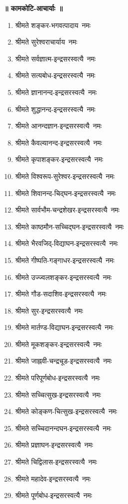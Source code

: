 \begin{center}
\begin{flushleft}
\medskip

\centerline{\bfseries ॥ कामकोटि-आचार्याः ॥}
\begin{enumerate}
\item श्रीमते शङ्कर-भगवत्पादाय~नमः
\item श्रीमते सुरेश्वराचार्याय~नमः
\item श्रीमते सर्वज्ञात्म-इन्द्रसरस्वत्यै~नमः
\item श्रीमते सत्यबोध-इन्द्रसरस्वत्यै~नमः
\item श्रीमते ज्ञानानन्द-इन्द्रसरस्वत्यै~नमः
\item श्रीमते शुद्धानन्द-इन्द्रसरस्वत्यै~नमः
\item श्रीमते आनन्दज्ञान-इन्द्रसरस्वत्यै~नमः
\item श्रीमते कैवल्यानन्द-इन्द्रसरस्वत्यै~नमः
\item श्रीमते कृपाशङ्कर-इन्द्रसरस्वत्यै~नमः
\item श्रीमते विश्वरूप-सुरेश्वर-इन्द्रसरस्वत्यै~नमः
\item श्रीमते शिवानन्द-चिद्घन-इन्द्रसरस्वत्यै~नमः
\item श्रीमते सार्वभौम-चन्द्रशेखर-इन्द्रसरस्वत्यै~नमः
\item श्रीमते काष्ठमौन-सच्चिद्घन-इन्द्रसरस्वत्यै~नमः
\item श्रीमते भैरवजिद्-विद्याघन-इन्द्रसरस्वत्यै~नमः
\item श्रीमते गीष्पति-गङ्गाधर-इन्द्रसरस्वत्यै~नमः
\item श्रीमते उज्ज्वलशङ्कर-इन्द्रसरस्वत्यै~नमः
\item श्रीमते गौड-सदाशिव-इन्द्रसरस्वत्यै~नमः
\item श्रीमते सुर-इन्द्रसरस्वत्यै~नमः
\item श्रीमते मार्तण्ड-विद्याघन-इन्द्रसरस्वत्यै~नमः
\item श्रीमते मूकशङ्कर-इन्द्रसरस्वत्यै~नमः
\item श्रीमते जाह्नवी-चन्द्रचूड-इन्द्रसरस्वत्यै~नमः
\item श्रीमते परिपूर्णबोध-इन्द्रसरस्वत्यै~नमः
\item श्रीमते सच्चित्सुख-इन्द्रसरस्वत्यै~नमः
\item श्रीमते कोङ्कण-चित्सुख-इन्द्रसरस्वत्यै~नमः
\item श्रीमते सच्चिदानन्दघन-इन्द्रसरस्वत्यै~नमः
\item श्रीमते प्रज्ञाघन-इन्द्रसरस्वत्यै~नमः
\item श्रीमते चिद्विलास-इन्द्रसरस्वत्यै~नमः
\item श्रीमते महादेव-इन्द्रसरस्वत्यै~नमः
\item श्रीमते पूर्णबोध-इन्द्रसरस्वत्यै~नमः

\end{enumerate}
\end{flushleft}
\end{center}
